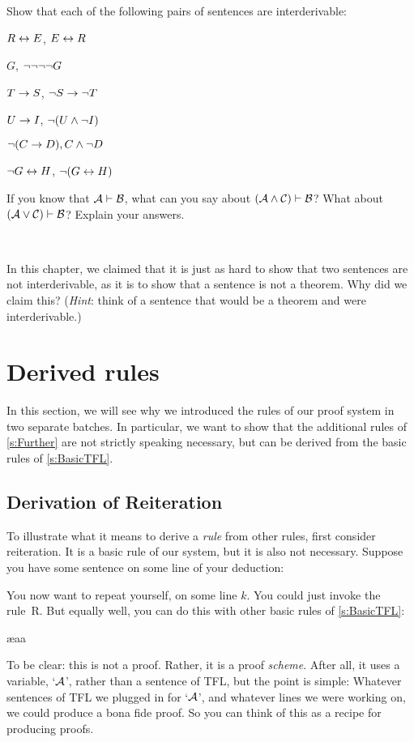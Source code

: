 \problempart
Show that each of the following pairs of sentences are interderivable:
\begin{compactlist}
\item $R \leftrightarrow E$, $E \leftrightarrow R$
\item $G$, $\neg\neg\neg\neg G$
\item $T\rightarrow S$, $\neg S \rightarrow \neg T$
\item $U \rightarrow I$, $\neg(U \wedge \neg I)$
\item $\neg (C \rightarrow D), C \wedge \neg D$
\item $\neg G \leftrightarrow H$, $\neg(G \leftrightarrow H)$ 
\end{compactlist}

\problempart
If you know that $\mathcal{A}\vdash\mathcal{B}$, what can you say about $(\mathcal{A}\wedge\mathcal{C})\vdash\mathcal{B}$? What about $(\mathcal{A}\vee\mathcal{C})\vdash\mathcal{B}$? Explain your answers.

\

\problempart In this chapter, we claimed that it is just as hard to show that two sentences are not interderivable, as it is to show that a sentence is not a theorem. Why did we claim this? (\emph{Hint}: think of a sentence that would be a theorem \ifeff{}  and  were interderivable.)


\chapter{Derived rules}\label{s:Derived}
In this section, we will see why we introduced the rules of our proof system in two separate batches. In particular, we want to show that the additional rules of \cref{s:Further} are not strictly speaking necessary, but can be derived from the basic rules of \cref{s:BasicTFL}.

\section{Derivation of Reiteration}
To illustrate what it means to derive a \emph{rule} from other rules, first consider reiteration. It is a basic rule of our system, but it is also not necessary. Suppose you have some sentence on some line of your deduction:
\begin{fitchproof}
\end{fitchproof}
You now want to repeat yourself, on some line $k$. You could just invoke the rule~R. But equally well, you can do this with other basic rules of \cref{s:BasicTFL}:
\begin{fitchproof}
	\ae{aa}
\end{fitchproof}
To be clear: this is not a proof. Rather, it is a proof \emph{scheme}. After all, it uses a variable, `$\mathcal{A}$', rather than a sentence of TFL, but the point is simple: Whatever sentences of TFL we plugged in for `$\mathcal{A}$', and whatever lines we were working on, we could produce a bona fide proof. So you can think of this as a recipe for producing proofs.

